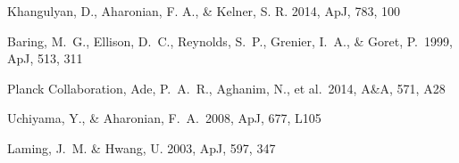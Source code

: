 \documentclass{PoS}
\newcommand\apj{ApJ}
\newcommand\aap{A\&A}
\newcommand\apjl{ApJ}
\newcommand\prd{Phys. Rev. D}
\begin{document}
\begin{thebibliography}{99}
Khangulyan, D., Aharonian, F. A., \& Kelner, S. R. 2014, ApJ, 783, 100













 Baring, M.~G., Ellison, D.~C., Reynolds, S.~P., Grenier, I.~A., \& Goret, P.\ 1999, \apj, 513, 311 

 Planck Collaboration, Ade, P.~A.~R., Aghanim, N., et al.\ 2014, \aap, 571, A28








 Uchiyama, Y., \& Aharonian, F.~A.\ 2008, \apjl, 677, L105 

 Laming, J.~M. \& Hwang, U. 2003, ApJ, 597, 347







\end{thebibliography}
\end{document}
